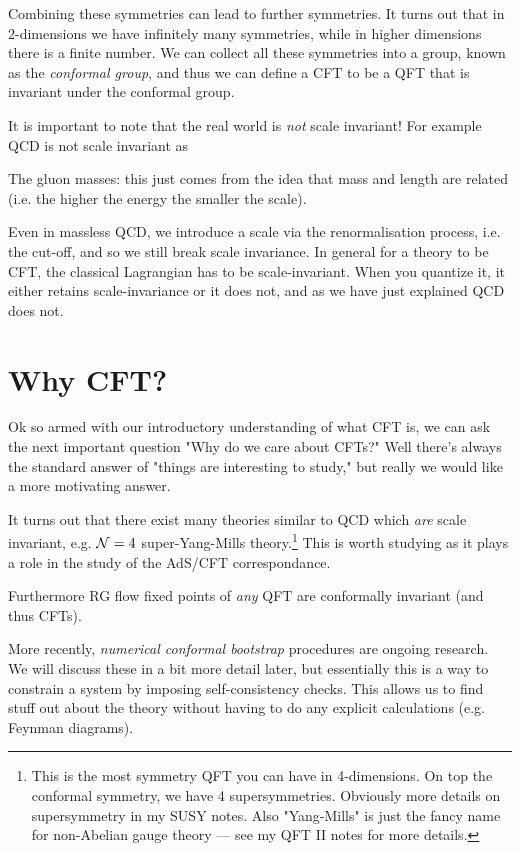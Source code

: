 Combining these symmetries can lead to further symmetries. It turns out that in $2$-dimensions we have infinitely many symmetries, while in higher dimensions there is a finite number. We can collect all these symmetries into a group, known as the \textit{conformal group}, and thus we can define a CFT to be a QFT that is invariant under the conformal group.

\br 
    It is important to note that the real world is \textit{not} scale invariant! For example QCD is not scale invariant as 
    \ben[label=(\roman*)]
        \item The gluon masses: this just comes from the idea that mass and length are related (i.e. the higher the energy the smaller the scale). 
        \item Even in massless QCD, we introduce a scale via the renormalisation process, i.e. the cut-off, and so we still break scale invariance. 
    \een 
    In general for a theory to be CFT, the classical Lagrangian has to be scale-invariant. When you quantize it, it either retains scale-invariance or it does not, and as we have just explained QCD does not. 
\er 

\section{Why CFT?}

Ok so armed with our introductory understanding of what CFT is, we can ask the next important question "Why do we care about CFTs?" Well there's always the standard answer of "things are interesting to study," but really we would like a more motivating answer. 

It turns out that there exist many theories similar to QCD which \textit{are} scale invariant, e.g. $\mathcal{N}=4$ super-Yang-Mills theory.\footnote{This is the most symmetry QFT you can have in 4-dimensions. On top the conformal symmetry, we have 4 supersymmetries. Obviously more details on supersymmetry in my SUSY notes. Also "Yang-Mills" is just the fancy name for non-Abelian gauge theory --- see my QFT II notes for more details.} This is worth studying as it plays a role in the study of the AdS/CFT correspondance.

Furthermore RG flow fixed points of \textit{any} QFT are conformally invariant (and thus CFTs).

More recently, \textit{numerical conformal bootstrap} procedures are ongoing research. We will discuss these in a bit more detail later, but essentially this is a way to constrain a system by imposing self-consistency checks. This allows us to find stuff out about the theory without having to do any explicit calculations (e.g. Feynman diagrams).

